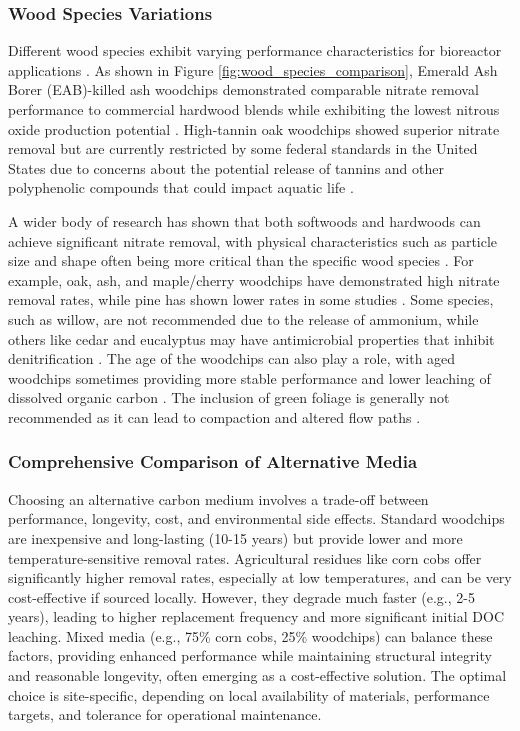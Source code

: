 \documentclass[12pt,a4paper]{article}
\begin{document}
\subsubsection{Wood Species Variations}

Different wood species exhibit varying performance characteristics for bioreactor applications \citep{new_ref_4}. As shown in Figure \ref{fig:wood_species_comparison}, Emerald Ash Borer (EAB)-killed ash woodchips demonstrated comparable nitrate removal performance to commercial hardwood blends while exhibiting the lowest nitrous oxide production potential \citep{new_ref_4}. High-tannin oak woodchips showed superior nitrate removal but are currently restricted by some federal standards in the United States due to concerns about the potential release of tannins and other polyphenolic compounds that could impact aquatic life \citep{new_ref_4}.

A wider body of research has shown that both softwoods and hardwoods can achieve significant nitrate removal, with physical characteristics such as particle size and shape often being more critical than the specific wood species \citep{new_ref_1}. For example, oak, ash, and maple/cherry woodchips have demonstrated high nitrate removal rates, while pine has shown lower rates in some studies \citep{new_ref_2}. Some species, such as willow, are not recommended due to the release of ammonium, while others like cedar and eucalyptus may have antimicrobial properties that inhibit denitrification \citep{new_ref_4, RN625}. The age of the woodchips can also play a role, with aged woodchips sometimes providing more stable performance and lower leaching of dissolved organic carbon \citep{new_ref_4}. The inclusion of green foliage is generally not recommended as it can lead to compaction and altered flow paths \citep{new_ref_4}.

\subsubsection{Comprehensive Comparison of Alternative Media}

Choosing an alternative carbon medium involves a trade-off between performance, longevity, cost, and environmental side effects. Standard woodchips are inexpensive and long-lasting (10-15 years) but provide lower and more temperature-sensitive removal rates. Agricultural residues like corn cobs offer significantly higher removal rates, especially at low temperatures, and can be very cost-effective if sourced locally. However, they degrade much faster (e.g., 2-5 years), leading to higher replacement frequency and more significant initial DOC leaching. Mixed media (e.g., 75\% corn cobs, 25\% woodchips) can balance these factors, providing enhanced performance while maintaining structural integrity and reasonable longevity, often emerging as a cost-effective solution. The optimal choice is site-specific, depending on local availability of materials, performance targets, and tolerance for operational maintenance.
\end{document}
